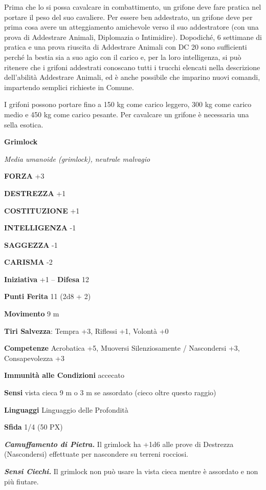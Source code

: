 \begin{multicols}{2}
Prima che lo si possa cavalcare in combattimento, un grifone deve fare pratica nel portare il peso del suo cavaliere. Per essere ben addestrato, un grifone deve per prima cosa avere un atteggiamento amichevole verso il suo addestratore (con una prova di Addestrare Animali, Diplomazia o Intimidire). Dopodiché, 6 settimane di pratica e una prova riuscita di Addestrare Animali con DC 20 sono sufficienti perché la bestia sia a suo agio con il carico e, per la loro intelligenza, si può ritenere che i grifoni addestrati conoscano tutti i trucchi elencati nella descrizione dell'abilità Addestrare Animali, ed è anche possibile che imparino nuovi comandi, impartendo semplici richieste in Comune.

I grifoni possono portare fino a 150 kg come carico leggero, 300 kg come carico medio e 450 kg come carico pesante. Per cavalcare un grifone è necessaria una sella esotica.


\medskip{}\textbf{Grimlock}

\textit{Media umanoide (grimlock), neutrale malvagio}

\textbf{FORZA} +3

\textbf{DESTREZZA} +1

\textbf{COSTITUZIONE} +1

\textbf{INTELLIGENZA} -1

\textbf{SAGGEZZA} -1

\textbf{CARISMA} -2

\textbf{Iniziativa} +1 -- \textbf{Difesa} 12

\textbf{Punti Ferita} 11 (2d8 + 2)

\textbf{Movimento} 9 m

\textbf{Tiri Salvezza}: Tempra +3, Riflessi +1, Volontà +0

\textbf{Competenze} Acrobatica +5, Muoversi Silenziosamente / Nascondersi +3, Consapevolezza +3

\textbf{Immunità alle Condizioni} accecato

\textbf{Sensi} vista cieca 9 m o 3 m se assordato (cieco oltre questo raggio)

\textbf{Linguaggi} Linguaggio delle Profondità

\textbf{Sfida} 1/4 (50 PX)

\textit{\textbf{Camuffamento di Pietra.}} Il grimlock ha +1d6 alle prove di Destrezza (Nascondersi) effettuate per nascondere su terreni rocciosi.

\textit{\textbf{Sensi Ciechi.}} Il grimlock non può usare la vista cieca mentre è assordato e non più fiutare.


\end{multicols}
